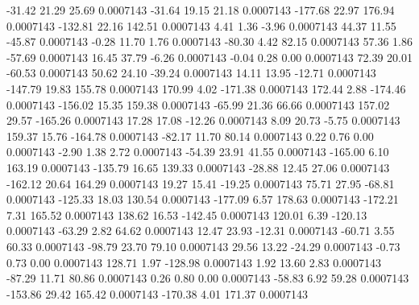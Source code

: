       -31.42       21.29       25.69     0.0007143
      -31.64       19.15       21.18     0.0007143
     -177.68       22.97      176.94     0.0007143
     -132.81       22.16      142.51     0.0007143
        4.41        1.36       -3.96     0.0007143
       44.37       11.55      -45.87     0.0007143
       -0.28       11.70        1.76     0.0007143
      -80.30        4.42       82.15     0.0007143
       57.36        1.86      -57.69     0.0007143
       16.45       37.79       -6.26     0.0007143
       -0.04        0.28        0.00     0.0007143
       72.39       20.01      -60.53     0.0007143
       50.62       24.10      -39.24     0.0007143
       14.11       13.95      -12.71     0.0007143
     -147.79       19.83      155.78     0.0007143
      170.99        4.02     -171.38     0.0007143
      172.44        2.88     -174.46     0.0007143
     -156.02       15.35      159.38     0.0007143
      -65.99       21.36       66.66     0.0007143
      157.02       29.57     -165.26     0.0007143
       17.28       17.08      -12.26     0.0007143
        8.09       20.73       -5.75     0.0007143
      159.37       15.76     -164.78     0.0007143
      -82.17       11.70       80.14     0.0007143
        0.22        0.76        0.00     0.0007143
       -2.90        1.38        2.72     0.0007143
      -54.39       23.91       41.55     0.0007143
     -165.00        6.10      163.19     0.0007143
     -135.79       16.65      139.33     0.0007143
      -28.88       12.45       27.06     0.0007143
     -162.12       20.64      164.29     0.0007143
       19.27       15.41      -19.25     0.0007143
       75.71       27.95      -68.81     0.0007143
     -125.33       18.03      130.54     0.0007143
     -177.09        6.57      178.63     0.0007143
     -172.21        7.31      165.52     0.0007143
      138.62       16.53     -142.45     0.0007143
      120.01        6.39     -120.13     0.0007143
      -63.29        2.82       64.62     0.0007143
       12.47       23.93      -12.31     0.0007143
      -60.71        3.55       60.33     0.0007143
      -98.79       23.70       79.10     0.0007143
       29.56       13.22      -24.29     0.0007143
       -0.73        0.73        0.00     0.0007143
      128.71        1.97     -128.98     0.0007143
        1.92       13.60        2.83     0.0007143
      -87.29       11.71       80.86     0.0007143
        0.26        0.80        0.00     0.0007143
      -58.83        6.92       59.28     0.0007143
     -153.86       29.42      165.42     0.0007143
     -170.38        4.01      171.37     0.0007143
